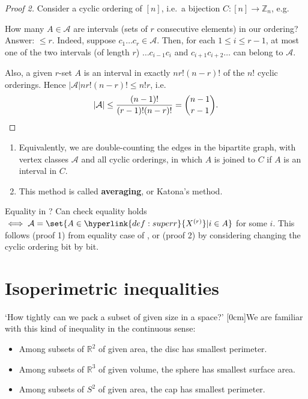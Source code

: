 \documentclass{article}
\newcommand{\A}{\mathcal{A}}
\newcommand{\named}[1]{\textbf{#1}\index{#1}}
\begin{document}
\begin{proof}[Proof 2]
  Consider a cyclic ordering of $[n]$, i.e.\ a bijection $C: [n] \to \mathbb{Z}_n$, e.g.
  \begin{center}
  \end{center}
  How many $A \in \A$ are intervals (sets of $r$ consecutive elements) in our ordering?
  Answer: $\leq r$. Indeed, suppose $c_1 \dots c_r \in \mathcal{A}$.
  Then, for each $1 \leq i \leq r-1$, at most one of the two intervals (of length $r$) $\dots c_{i-1} c_i$ and $c_{i+1} c_{i+2} \dots$ can belong to $\A$.

  Also, a given $r$-set $A$ is an interval in exactly $n r! (n-r)!$ of the $n!$ cyclic orderings.
  Hence $|\A| n r! (n-r)! \leq n! r$, i.e.
  \begin{equation*}
    |\A| \leq \frac{(n-1)!}{(r-1)! (n-r)!} = \binom{n-1}{r-1}. \qedhere
  \end{equation*}
\end{proof}
\begin{remark}\leavevmode
  \begin{enumerate}
    \item Equivalently, we are double-counting the edges in the bipartite graph, with vertex classes $\A$ and all cyclic orderings, in which $A$ is joined to $C$ if $A$ is an interval in $C$.
    \item This method is called \named{averaging}, or Katona's method.
  \end{enumerate}
\end{remark}
Equality in ?
Can check equality holds $\iff \A = \set{A \in \hyperlink{def:superr}{X^{(r)}} | i \in A}$ for some $i$.
This follows (proof 1) from equality case of , or (proof 2) by considering changing the cyclic ordering bit by bit.
\clearpage
\section{Isoperimetric inequalities}
`How tightly can we pack a subset of given size in a space?'
[0cm]We are familiar with this kind of inequality in the continuous sense:
\begin{itemize}
  \item Among subsets of $\mathbb{R}^2$ of given area, the disc has smallest perimeter.
  \item Among subsets of $\mathbb{R}^3$ of given volume, the sphere has smallest surface area.
  \item Among subsets of $S^2$ of given area, the cap has smallest perimeter.
\end{itemize}
\end{document}
